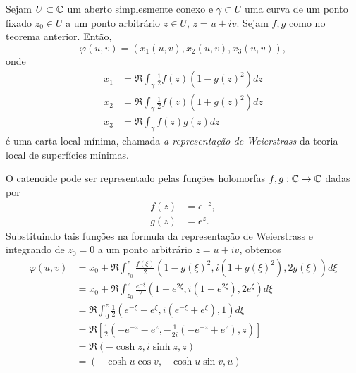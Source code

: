 \begin{definicao}
	Sejam $U \subset \mathbb{C}$ um aberto simplesmente conexo e $\gamma \subset U$ uma curva de um ponto fixado $z_0 \in U$ a um ponto arbitrário $z \in U$, $z = u + iv$.
	Sejam $f,g$ como no teorema anterior. Então,
	\begin{equation*}
	\varphi(u,v) = (x_1(u,v), x_2(u,v), x_3(u,v)),
	\end{equation*}
	onde
	\begin{align*}
	x_1 &= \Re \int_{\gamma} \frac{1}{2} f(z) (1 - g(z)^2) dz\\
	x_2 &= \Re \int_{\gamma} \frac{1}{2} f(z) (1 + g(z)^2) dz\\
	x_3 &= \Re \int_{\gamma} f(z) g(z) dz
	\end{align*}
	é uma carta local mínima, chamada \emph{a representação de Weierstrass} da teoria local de superfícies mínimas.
\end{definicao}

\begin{exemplo}[Catenoide]
	O catenoide pode ser representado pelas funções holomorfas $f, g: \mathbb{C} \rightarrow \mathbb{C}$ dadas por
	\begin{align*}
	f(z) &= e^{-z},\\
	g(z) &= e^z.
	\end{align*}
	Substituindo tais funções na formula da representação de Weierstrass e integrando de $z_0 = 0$ a um ponto arbitrário $z = u + iv$, obtemos
	\begin{align*}
	\varphi(u,v) &= x_0 + \Re \int_{z_0}^{z} \frac{f(\xi)}{2} (1 - g(\xi)^2, i (1 + g(\xi)^2), 2 g(\xi)) d\xi\\
	&= x_0 + \Re \int_{z_0}^{z} \frac{e^{-\xi}}{2} (1 - e^{2\xi}, i (1 + e^{2\xi}), 2e^{\xi}) d\xi\\
	&= \Re \int_{0}^{z} \frac{1}{2} (e^{-\xi} - e^{\xi}, i (e^{-\xi} + e^{\xi}), 1) d\xi\\
	&= \Re \left[ \frac{1}{2} \left(-e^{-z} - e^z, -\frac{1}{2i} (-e^{-z} + e^z), z \right) \right] \\
	&= \Re \left( -\cosh z, i \sinh z, z \right) \\
	&= \left( -\cosh u \cos v, -\cosh u \sin v, u \right)
	\end{align*} 
\end{exemplo}

